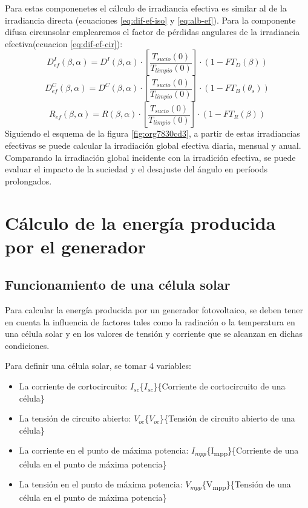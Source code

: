 Para estas componenetes el cálculo de irradiancia efectiva es similar al de la irradiancia directa (ecuaciones \ref{eq:dif-ef-iso} y \ref{eq:alb-ef}). Para la componente difusa circunsolar emplearemos el factor de pérdidas angulares de la irradiancia efectiva(ecuacion \ref{eq:dif-ef-cir}):
\begin{equation}
D_{ef}^I(\beta ,\alpha)=D^I(\beta ,\alpha)\cdot[\frac{T_{sucio}(0)}{T_{limpio}(0)}]\cdot (1-FT_D(\beta))
\label{eq:dif-ef-iso}
\end{equation}
\begin{equation}
D_{ef}^C(\beta ,\alpha)=D^C(\beta ,\alpha)\cdot[\frac{T_{sucio}(0)}{T_{limpio}(0)}]\cdot (1-FT_B(\theta_s))
\label{eq:dif-ef-cir}
\end{equation}
\begin{equation}
R_{ef}(\beta ,\alpha)=R(\beta ,\alpha)\cdot[\frac{T_{sucio}(0)}{T_{limpio}(0)}]\cdot (1-FT_R(\beta))
\label{eq:alb-ef}
\end{equation}
Siguiendo el esquema de la figura \ref{fig:org7830cd3}, a partir de estas irradiancias efectivas se puede calcular la irradiación global efectiva diaria, mensual y anual. Comparando la irradiación global incidente con la irradición efectiva, se puede evaluar el impacto de la suciedad y el desajuste del ángulo en períoods prolongados.

\section{Cálculo de la energía producida por el generador}
\label{sec:orge9573a8}
\label{sec:calculo-energia-producida-generador}

\subsection{Funcionamiento de una célula solar}
\label{sec:org35a5e69}
\label{subsec:funcionamiento-celula-solar}
Para calcular la energía producida por un generador fotovoltaico, se deben tener en cuenta la influencia de factores tales como la radiación o la temperatura en una célula solar y en los valores de tensión y corriente que se alcanzan en dichas condiciones.

Para definir una célula solar, se tomar 4 variables:
\begin{itemize}
\item La corriente de cortocircuito: \(I_{sc}\)\nomenclature[Isc]\{\(I_{sc}\)\}\{Corriente de cortocircuito de una célula\}
\item La tensión de circuito abierto: \(V_{oc}\)\nomenclature[VOC]\{\(V_{oc}\)\}\{Tensión de circuito abierto de una célula\}
\item La corriente en el punto de máxima potencia: \(I_{mpp}\)\nomenclature[Impp]\{I\textsubscript{mpp}\}\{Corriente de una célula en el punto de máxima potencia\}
\item La tensión en el punto de máxima potencia: \(V_{mpp}\)\nomenclature[Vmpp]\{V\textsubscript{mpp}\}\{Tensión de una célula en el punto de máxima potencia\}
\end{itemize}

